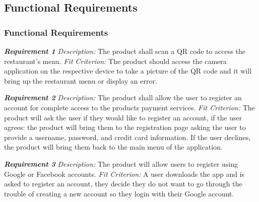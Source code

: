 \documentclass[12pt, titlepage]{article}
\begin{document}
\subsection{Functional Requirements}

\subsubsection{Functional Requirements}

\textbf{\textit{Requirement 1}}\newline
\textit{Description:}\newline
The product shall scan a QR code to access the restaurant's menu.\newline\newline
\textit{Fit Criterion:}\newline 
The product should access the camera application on the respective device to take a picture of the QR code and it will bring up the restaurant menu or display an error.
\newline

\textbf{\textit{Requirement 2}}\newline
\textit{Description:}\newline
The product shall allow the user to register an account for complete access to the products payment services. \newline\newline
\textit{Fit Criterion:}\newline 
The product will ask the user if they would like to register an account, if the user agrees: the product will bring them to the registration page asking the user to provide a username, password, and credit card information. If the user declines, the product will bring them back to the main menu of the application.
\newline

\textbf{\textit{Requirement 3}}\newline
\textit{Description:}\newline
The product will allow users to register using Google or Facebook accounts. \newline\newline
\textit{Fit Criterion:}\newline 
A user downloads the app and is asked to register an account, they decide they do not want to go through the trouble of creating a new account so they login with their Google account.
\newline
\end{document}
